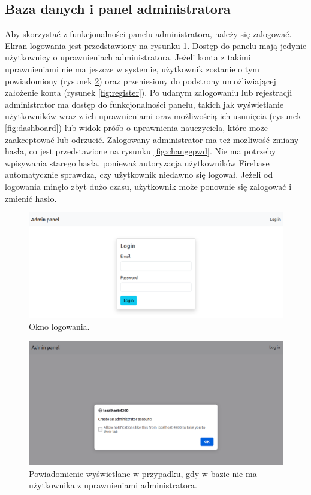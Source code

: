 \documentclass[a4paper,twoside,12pt]{book}
\begin{document}
\subsection{Baza danych i panel administratora}

Aby skorzystać z funkcjonalności panelu administratora, należy się zalogować. Ekran logowania jest przedstawiony na rysunku \ref{fig:login}. Dostęp do panelu mają jedynie użytkownicy o uprawnieniach administratora. Jeżeli konta z takimi uprawnieniami nie ma jeszcze w systemie, użytkownik zostanie o tym powiadomiony (rysunek \ref{fig:alert}) oraz przeniesiony do podstrony umożliwiającej założenie konta (rysunek \ref{fig:register}). Po udanym zalogowaniu lub rejestracji administrator ma dostęp do funkcjonalności panelu, takich jak wyświetlanie użytkowników wraz z ich uprawnieniami oraz możliwością ich usunięcia (rysunek \ref{fig:dashboard}) lub widok próśb o uprawnienia nauczyciela, które może zaakceptować lub odrzucić. Zalogowany administrator ma też możliwość zmiany hasła, co jest przedstawione na rysunku \ref{fig:changepwd}. Nie ma potrzeby wpisywania starego hasła, ponieważ autoryzacja użytkowników Firebase automatycznie sprawdza, czy użytkownik niedawno się logował. Jeżeli od logowania minęło zbyt dużo czasu, użytkownik może ponownie się zalogować i zmienić hasło. 

\begin{figure}[]
\centering
\includegraphics[width=\textwidth]{adminpanel/login}
\caption{Okno logowania.}
\label{fig:login}
\end{figure}

\begin{figure}[]
\centering
\includegraphics[width=\textwidth]{adminpanel/alert}
\caption{Powiadomienie wyświetlane w przypadku, gdy w bazie nie ma użytkownika z uprawnieniami administratora.}
\label{fig:alert}
\end{figure}
\end{document}

